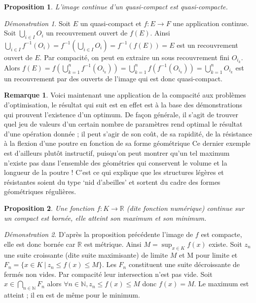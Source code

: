 \documentclass[a4paper, 11pt, french]{book}
\theoremstyle{plain} %
\newtheorem{proposition}{Proposition}
\theoremstyle{definition} %
\newtheorem{remarque}{Remarque}
\theoremstyle{remark} %
\newtheorem*{demonstration}{Démonstration}
\newcommand{\1}{\mathds{1}}
\newcommand{\infegal}{\leqslant}
\newcommand{\inv}[1]{#1^{-1}}
\newcommand{\N}{\mathbb{N}}
\newcommand{\R}{\mathbb{R}}
\newcommand\ens[2]{\{#1 \ |\ #2\}}
\begin{document}
\begin{proposition}
	L’image continue d’un quasi-compact est quasi-compacte.
\end{proposition}

\begin{demonstration}
	Soit $E$ un quasi-compact et $f:E\rightarrow F$ une application continue.
	Soit $\bigcup_{i\in I}O_i$ un recouvrement ouvert de $f(E)$.
	Ainsi $\bigcup_{i\in I}\inv{f}(O_i)=\inv{f}(\bigcup_{i\in I}O_i)=\inv{f}(f(E))=E$ est un recouvrement ouvert de $E$.
	Par compacité, on peut en extraire un sous recouvrement fini $O_{i_k}$.
	Alors $f(E)=f(\bigcup_{k=1}^n\inv{f}(O_{i_k}))=\bigcup_{k=1}^nf(\inv{f}(O_{i_k}))=\bigcup_{k=1}^nO_{i_k}$ est un recouvrement par des ouverts de l'image qui est donc quasi-compact.
\end{demonstration}

\begin{remarque}
	Voici maintenant une application de la compacité aux problèmes d’optimisation, le résultat qui suit est en effet est à la base des démonstrations qui prouvent l’existence d’un optimum.
	De façon générale, il s’agit de trouver quel jeu de valeurs d’un certain nombre de paramètres rend optimal le résultat d’une opération donnée ; il peut s’agir de son coût, de sa rapidité, de la résistance à la flexion d’une poutre en fonction de sa forme géométrique Ce dernier exemple est d’ailleurs plutôt instructif, puisqu’on peut montrer qu’un tel maximum n’existe pas dans l’ensemble des géométries qui conservent le volume et la longueur de la poutre !
	C’est ce qui explique que les structures légères et résistantes soient du type ‘nid d’abeilles’ et sortent du cadre des formes géométriques régulières.
\end{remarque}

\begin{proposition}
	Une fonction $f:K\rightarrow\R$ (dite fonction numérique) continue sur un compact est bornée, elle atteint son maximum et son minimum.
\end{proposition}

\begin{demonstration}
	D’après la proposition précédente l’image de $f$ est compacte, elle est donc bornée car $\R$ est métrique.
	Ainsi $M=\sup_{x\in K}f(x)$ existe.
	Soit $z_n$ une suite croissante (dite suite maximisante) de limite $M$ et  M pour limite et $F_n=\ens{x\in K}{z_n\infegal f(x)\infegal M}$.
	Les $F_n$ constituent une suite décroissante de fermés non vides.
	Par compacité leur intersection n’est pas vide.
	Soit $x\in\bigcap_{n\in\N}F_n$ alors $\forall n\in\N, z_n\infegal f(x)\infegal M$ donc $f(x)=M$.
	Le maximum est atteint ; il en est de même pour le minimum.
\end{demonstration}
\end{document}
